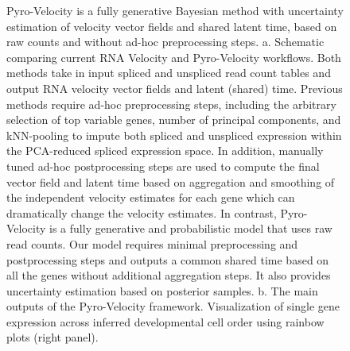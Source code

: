 \documentclass[
  sn-mathphys-num,
  lineno,
  twocolumn]{sn-jnl}
\begin{document}
\begin{figure}


\caption{\label{fig-model}Pyro-Velocity is a fully generative Bayesian
method with uncertainty estimation of velocity vector fields and shared
latent time, based on raw counts and without ad-hoc preprocessing steps.
a. Schematic comparing current RNA Velocity and Pyro-Velocity workflows.
Both methods take in input spliced and unspliced read count tables and
output RNA velocity vector fields and latent (shared) time. Previous
methods require ad-hoc preprocessing steps, including the arbitrary
selection of top variable genes, number of principal components, and
kNN-pooling to impute both spliced and unspliced expression within the
PCA-reduced spliced expression space. In addition, manually tuned ad-hoc
postprocessing steps are used to compute the final vector field and
latent time based on aggregation and smoothing of the independent
velocity estimates for each gene which can dramatically change the
velocity estimates. In contrast, Pyro-Velocity is a fully generative and
probabilistic model that uses raw read counts. Our model requires
minimal preprocessing and postprocessing steps and outputs a common
shared time based on all the genes without additional aggregation steps.
It also provides uncertainty estimation based on posterior samples. b.
The main outputs of the Pyro-Velocity framework. Visualization of single
gene expression across inferred developmental cell order using rainbow
plots (right panel).}

\end{figure}%
\end{document}

